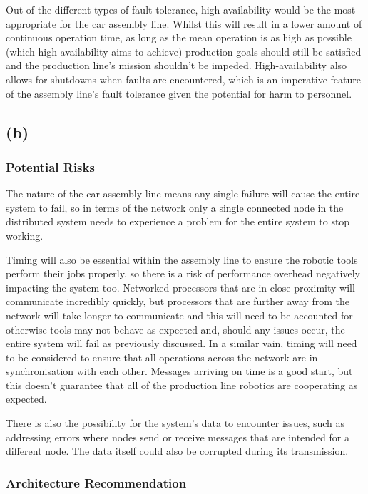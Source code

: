 \documentclass[]{report}
\begin{document}
				Out of the different types of fault-tolerance, high-availability would be the most appropriate for the car assembly line. Whilst this will result in a lower amount of continuous operation time, as long as the mean operation is as high as possible (which high-availability aims to achieve) production goals should still be satisfied and the production line's mission shouldn't be impeded. High-availability also allows for shutdowns when faults are encountered, which is an imperative feature of the assembly line's fault tolerance given the potential for harm to personnel.
			
			\subsection{(b)}
				\subsubsection{Potential Risks}
				The nature of the car assembly line means any single failure will cause the entire system to fail, so in terms of the network only a single connected node in the distributed system needs to experience a problem for the entire system to stop working. 
				
				Timing will also be essential within the assembly line to ensure the robotic tools perform their jobs properly, so there is a risk of performance overhead negatively impacting the system too. Networked processors that are in close proximity will communicate incredibly quickly, but processors that are further away from the network will take longer to communicate and this will need to be accounted for otherwise tools may not behave as expected and, should any issues occur, the entire system will fail as previously discussed. In a similar vain, timing will need to be considered to ensure that all operations across the network are in synchronisation with each other. Messages arriving on time is a good start, but this doesn't guarantee that all of the production line robotics are cooperating as expected.
				
				There is also the possibility for the system's data to encounter issues, such as addressing errors where nodes send or receive messages that are intended for a different node. The data itself could also be corrupted during its transmission.
				
				\subsubsection{Architecture Recommendation}
						
\end{document}

